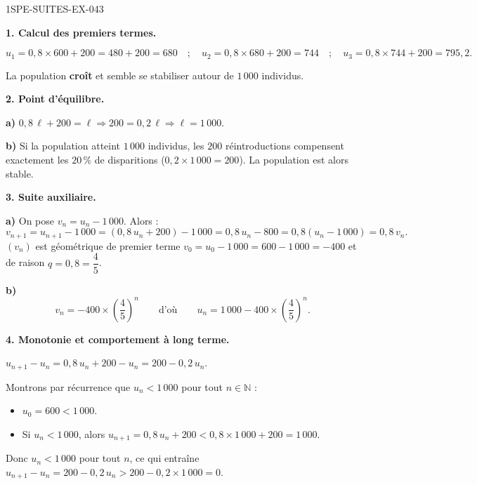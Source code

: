\begin{corrige}{1SPE-SUITES-EX-043}

\textbf{1. Calcul des premiers termes.}

\[
u_1 = 0{,}8 \times 600 + 200 = 480 + 200 = 680 \quad;\quad u_2 = 0{,}8 \times 680 + 200 = 744 \quad;\quad u_3 = 0{,}8 \times 744 + 200 = 795{,}2.
\]

La population \textbf{croît} et semble se stabiliser autour de $1\,000$ individus.

\textbf{2. Point d'équilibre.}


\textbf{a)} $0{,}8\,\ell + 200 = \ell \Rightarrow 200 = 0{,}2\,\ell \Rightarrow \ell = 1\,000$.

\textbf{b)} Si la population atteint $1\,000$ individus, les $200$ réintroductions compensent exactement les $20\,\%$ de disparitions ($0{,}2 \times 1\,000 = 200$). La population est alors stable.

\textbf{3. Suite auxiliaire.}

\textbf{a)} On pose $v_n = u_n - 1\,000$. Alors :
\[
v_{n+1} = u_{n+1} - 1\,000 = (0{,}8\,u_n + 200) - 1\,000 = 0{,}8\,u_n - 800 = 0{,}8(u_n - 1\,000) = 0{,}8\,v_n.
\]
$(v_n)$ est géométrique de premier terme $v_0 = u_0 - 1\,000 = 600 - 1\,000 = -400$ et de raison $q = 0{,}8 = \dfrac{4}{5}$.

\textbf{b)}
\[
v_n = -400 \times \left(\frac{4}{5}\right)^n \qquad \text{d'où} \qquad \boxed{u_n = 1\,000 - 400 \times \left(\frac{4}{5}\right)^n}.
\]

\textbf{4. Monotonie et comportement à long terme.}


$u_{n+1} - u_n = 0{,}8\,u_n + 200 - u_n = 200 - 0{,}2\,u_n$.

Montrons par récurrence que $u_n < 1\,000$ pour tout $n \in \mathbb{N}$ :
\begin{itemize}
  \item $u_0 = 600 < 1\,000$. \checkmark
  \item Si $u_n < 1\,000$, alors $u_{n+1} = 0{,}8\,u_n + 200 < 0{,}8 \times 1\,000 + 200 = 1\,000$. \checkmark
\end{itemize}

Donc $u_n < 1\,000$ pour tout $n$, ce qui entraîne $u_{n+1} - u_n = 200 - 0{,}2\,u_n > 200 - 0{,}2 \times 1\,000 = 0$.


\end{corrige}
